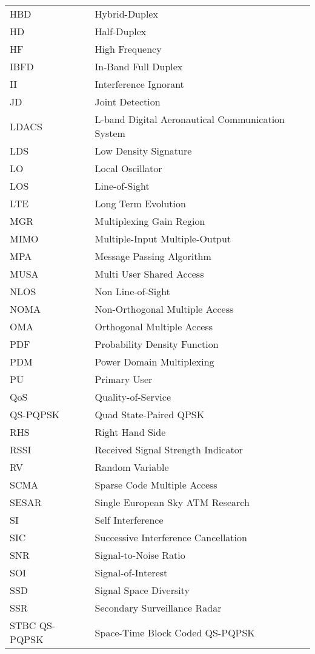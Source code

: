 
\begin{tabular}{ll}

HBD	& Hybrid-Duplex\\
HD	& Half-Duplex\\
HF	& High Frequency\\
IBFD	& In-Band Full Duplex\\
II	& Interference Ignorant\\
JD	& Joint Detection\\
LDACS	& L-band Digital Aeronautical Communication System\\
LDS	& Low Density Signature\\
LO	& Local Oscillator\\
LOS	& Line-of-Sight\\
LTE	& Long Term Evolution\\
MGR	& Multiplexing Gain Region\\
MIMO	& Multiple-Input Multiple-Output\\
MPA	& Message Passing Algorithm\\
MUSA	& Multi User Shared Access\\
NLOS	& Non Line-of-Sight\\
NOMA	& Non-Orthogonal Multiple Access\\
OMA	& Orthogonal Multiple Access\\
PDF	& Probability Density Function\\
PDM	& Power Domain Multiplexing\\
PU	& Primary User\\
QoS	& Quality-of-Service\\
QS-PQPSK	& Quad State-Paired QPSK\\
RHS	& Right Hand Side\\
RSSI	& Received Signal Strength Indicator\\
RV	& Random Variable\\
SCMA	& Sparse Code Multiple Access\\
SESAR	& Single European Sky ATM Research\\
SI	& Self Interference\\
SIC	& Successive Interference Cancellation\\
SNR	& Signal-to-Noise Ratio\\
SOI	& Signal-of-Interest\\
SSD	& Signal Space Diversity\\
SSR	& Secondary Surveillance Radar \\
STBC QS-PQPSK	& Space-Time Block Coded QS-PQPSK\\

\end{tabular}
